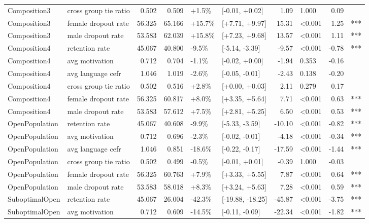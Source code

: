 \begin{longtable}[t]{llrrllrlrl}
Composition3 & cross group tie ratio & 0.502 & 0.509 & +1.5\% & {}[-0.01, +0.02] & 1.09 & 1.000 & 0.09 & \\
\addlinespace
Composition3 & female dropout rate & 56.325 & 65.166 & +15.7\% & {}[+7.71, +9.97] & 15.31 & <0.001 & 1.25 & ***\\
Composition3 & male dropout rate & 53.583 & 62.039 & +15.8\% & {}[+7.23, +9.68] & 13.57 & <0.001 & 1.11 & ***\\
Composition4 & retention rate & 45.067 & 40.800 & -9.5\% & {}[-5.14, -3.39] & -9.57 & <0.001 & -0.78 & ***\\
Composition4 & avg motivation & 0.712 & 0.704 & -1.1\% & {}[-0.02, +0.00] & -1.94 & 0.353 & -0.16 & \\
Composition4 & avg language cefr & 1.046 & 1.019 & -2.6\% & {}[-0.05, -0.01] & -2.43 & 0.138 & -0.20 & \\
\addlinespace
Composition4 & cross group tie ratio & 0.502 & 0.516 & +2.8\% & {}[+0.00, +0.03] & 2.11 & 0.279 & 0.17 & \\
Composition4 & female dropout rate & 56.325 & 60.817 & +8.0\% & {}[+3.35, +5.64] & 7.71 & <0.001 & 0.63 & ***\\
Composition4 & male dropout rate & 53.583 & 57.612 & +7.5\% & {}[+2.81, +5.25] & 6.50 & <0.001 & 0.53 & ***\\
OpenPopulation & retention rate & 45.067 & 40.608 & -9.9\% & {}[-5.33, -3.59] & -10.10 & <0.001 & -0.82 & ***\\
OpenPopulation & avg motivation & 0.712 & 0.696 & -2.3\% & {}[-0.02, -0.01] & -4.18 & <0.001 & -0.34 & ***\\
\addlinespace
OpenPopulation & avg language cefr & 1.046 & 0.851 & -18.6\% & {}[-0.22, -0.17] & -17.59 & <0.001 & -1.44 & ***\\
OpenPopulation & cross group tie ratio & 0.502 & 0.499 & -0.5\% & {}[-0.01, +0.01] & -0.39 & 1.000 & -0.03 & \\
OpenPopulation & female dropout rate & 56.325 & 60.763 & +7.9\% & {}[+3.33, +5.55] & 7.87 & <0.001 & 0.64 & ***\\
OpenPopulation & male dropout rate & 53.583 & 58.018 & +8.3\% & {}[+3.24, +5.63] & 7.28 & <0.001 & 0.59 & ***\\
SuboptimalOpen & retention rate & 45.067 & 26.004 & -42.3\% & {}[-19.88, -18.25] & -45.87 & <0.001 & -3.75 & ***\\
\addlinespace
SuboptimalOpen & avg motivation & 0.712 & 0.609 & -14.5\% & {}[-0.11, -0.09] & -22.34 & <0.001 & -1.82 & ***\\

\end{longtable}
